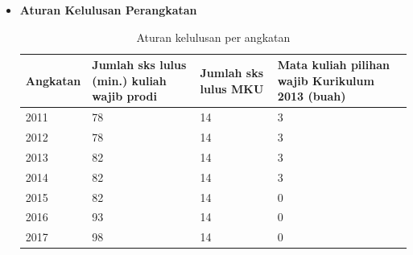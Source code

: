 \documentclass[a4paper,twoside]{article}
\begin{document}
\begin{enumerate}
\begin{enumerate}
\begin{itemize}
					\item \textbf{Aturan Kelulusan Perangkatan} \\
					\begin{table}[H]
					\centering
					\caption{Aturan kelulusan per angkatan}
					\label{tab:AturanKelulusan}
					\begin{tabular}{|p{2.5cm}|p{3.5cm}|p{3.5cm}|p{3.5cm}|}
					\hline
					\textbf{Angkatan} & \textbf{Jumlah sks lulus (min.) kuliah wajib prodi} & \textbf{Jumlah sks lulus MKU} & \textbf{Mata kuliah pilihan wajib Kurikulum 2013 (buah)} \\ \hline
					2011 & 78 & 14 & 3 \\ \hline
					2012 & 78 & 14 & 3 \\ \hline
					2013 & 82 & 14 & 3 \\ \hline
					2014 & 82 & 14 & 3 \\ \hline
					2015 & 82 & 14 & 0 \\ \hline
					2016 & 93 & 14 & 0 \\ \hline
					2017 & 98 & 14 & 0 \\ \hline
					\end{tabular}
					\end{table}
					

\end{itemize}
\end{enumerate}
\end{enumerate}
\end{document}
